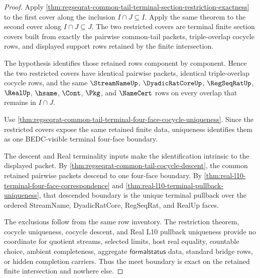 \begin{proof}
Apply \autoref{thm:regseqrat-common-tail-terminal-section-restriction-exactness} to the first cover along the inclusion $I \cap J \subseteq I$. Apply the same theorem to the second cover along $I \cap J \subseteq J$. The two restricted covers are terminal finite section covers built from exactly the pairwise common-tail packets, triple-overlap cocycle rows, and displayed support rows retained by the finite intersection.

The hypothesis identifies those retained rows component by component. Hence the two restricted covers have identical pairwise packets, identical triple-overlap cocycle rows, and the same $\StreamNameUp$, $\DyadicRatCoreUp$, $\RegSeqRatUp$, $\RealUp$, $\hsame$, $\Cont$, $\Pkg$, and $\NameCert$ rows on every overlap that remains in $I \cap J$.

Use \autoref{thm:regseqrat-common-tail-terminal-four-face-cocycle-uniqueness}. Since the restricted covers expose the same retained finite data, uniqueness identifies them as one BEDC-visible terminal four-face boundary.

The descent and Real terminality inputs make the identification intrinsic to the displayed packet. By \autoref{thm:regseqrat-common-tail-cocycle-descent}, the common retained pairwise packets descend to one four-face boundary. By \autoref{thm:real-l10-terminal-four-face-correspondence} and \autoref{thm:real-l10-terminal-pullback-uniqueness}, that descended boundary is the unique terminal pullback over the ordered StreamName, DyadicRatCore, RegSeqRat, and RealUp faces.

The exclusions follow from the same row inventory. The restriction theorem, cocycle uniqueness, cocycle descent, and Real L10 pullback uniqueness provide no coordinate for quotient streams, selected limits, host real equality, countable choice, ambient completeness, aggregate $\mathsf{formalstatus}$ data, standard bridge rows, or hidden completion carriers. Thus the meet boundary is exact on the retained finite intersection and nowhere else.
\end{proof}

